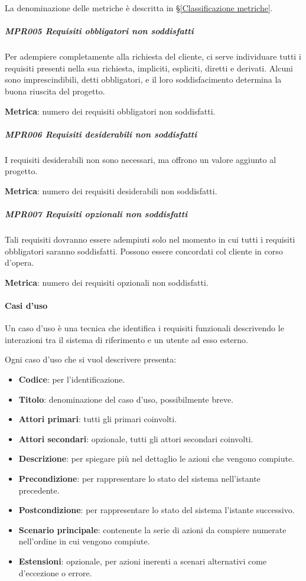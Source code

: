 		La denominazione delle metriche è descritta in \S\ref{Classificazione metriche}.

		\subparagraph{MPR005 Requisiti obbligatori non soddisfatti}
		Per adempiere completamente alla richiesta del cliente, ci serve individuare tutti i requisiti presenti nella sua richiesta, impliciti, espliciti, diretti e derivati. Alcuni sono imprescindibili, detti obbligatori, e il loro soddisfacimento determina la buona riuscita del progetto.

		\textbf{Metrica}: numero dei requisiti obbligatori non soddisfatti.

		\subparagraph{MPR006 Requisiti desiderabili non soddisfatti}
		I requisiti desiderabili non sono necessari, ma offrono un valore aggiunto al progetto.

		\textbf{Metrica}: numero dei requisiti desiderabili non soddisfatti.

		\subparagraph{MPR007 Requisiti opzionali non soddisfatti}
		Tali requisiti dovranno essere adempiuti solo nel momento in cui tutti i requisiti obbligatori saranno soddisfatti.
		Possono essere concordati col cliente in corso d'opera.

		\textbf{Metrica}: numero dei requisiti opzionali non soddisfatti.


		\paragraph{Casi d'uso}\label{PP:Sviluppo:AdR:CasiUso}
		Un caso d'uso è una tecnica che identifica i requisiti funzionali descrivendo le interazioni tra il sistema di riferimento e un utente ad esso esterno.\par
		Ogni caso d'uso che si vuol descrivere presenta:
		\begin{itemize}
		 	\item \textbf{Codice}: per l'identificazione.
		 	\item \textbf{Titolo}: denominazione del caso d'uso, possibilmente breve.
		 	\item \textbf{Attori primari}: tutti gli  primari coinvolti.
		 	\item \textbf{Attori secondari}: opzionale, tutti gli attori secondari coinvolti.
		 	\item \textbf{Descrizione}: per spiegare più nel dettaglio le azioni che vengono compiute.
		 	\item \textbf{Precondizione}: per rappresentare lo stato del sistema nell'istante precedente.
		 	\item \textbf{Postcondizione}: per rappresentare lo stato del sistema l'istante successivo.
		 	\item \textbf{Scenario principale}: contenente la serie di azioni da compiere numerate nell'ordine in cui vengono compiute.
		 	\item \textbf{Estensioni}: opzionale, per azioni inerenti a scenari alternativi come d'eccezione o errore.
		\end{itemize}

